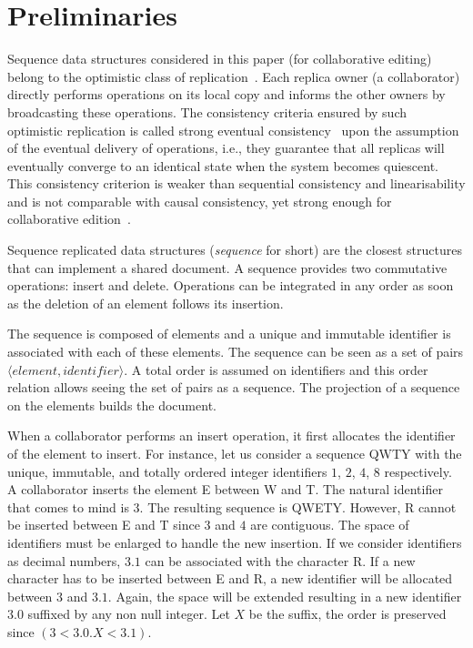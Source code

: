 
\section{Preliminaries}
\label{sec:preliminaries}

Sequence data structures considered in this paper (for collaborative editing)
belong to the optimistic class of replication~\cite{saito2005optimistic}. Each
replica owner (a collaborator) directly performs operations on its local copy
and informs the other owners by broadcasting these operations. The consistency
criteria ensured by such optimistic replication is called strong eventual
consistency~\cite{shapiro2011comprehensive} upon the assumption of the eventual
delivery of operations, i.e., they guarantee that all replicas will eventually
converge to an identical state when the system becomes quiescent. This
consistency criterion is weaker than sequential consistency and linearisability
and is not comparable with causal consistency, yet strong enough for
collaborative edition~\cite{shapiro2011comprehensive}.

Sequence replicated data structures (\emph{sequence} for short) are the closest
structures that can implement a shared document. A sequence provides two
commutative operations: insert and delete. Operations can be integrated in any
order as soon as the deletion of an element follows its insertion.

The sequence is composed of elements and a unique and immutable identifier is
associated with each of these elements. The sequence can be seen as a set of
pairs $\langle element, identifier \rangle$. A total order is assumed on
identifiers and this order relation allows seeing the set of pairs as a
sequence. The projection of a sequence on the elements builds the document.

When a collaborator performs an insert operation, it first allocates the
identifier of the element to insert. For instance, let us consider a sequence
QWTY with the unique, immutable, and totally ordered integer identifiers $1$,
$2$, $4$, $8$ respectively. A collaborator inserts the element E between W
and T. The natural identifier that comes to mind is $3$. The resulting
sequence is QWETY. However, R cannot be inserted between E and T since
$3$ and $4$ are contiguous. The space of identifiers must be enlarged to handle
the new insertion. If we consider identifiers as decimal numbers, $3.1$ can be
associated with the character R. If a new character has to be inserted
between E and R, a new identifier will be allocated between $3$ and
$3.1$. Again, the space will be extended resulting in a new identifier $3.0$
suffixed by any non null integer. Let $X$ be the suffix, the order is preserved
since $(3 < 3.0.X < 3.1)$.

